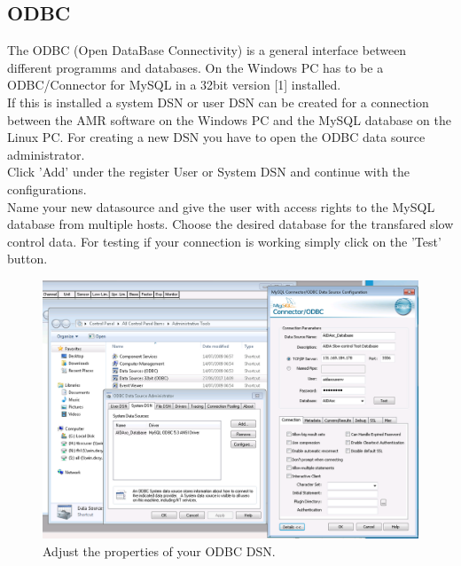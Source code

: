\documentclass[a4paper,12pt]{scrartcl}
\begin{document}
\subsection{ODBC}
The ODBC (Open DataBase Connectivity) is a general interface between different programms and databases. On the Windows PC has to be a ODBC/Connector for MySQL in a 32bit version [1] installed. \\
If this is installed a system DSN or user DSN can be created for a connection between the AMR software on the Windows PC and the MySQL database on the Linux PC. For creating a new DSN you have to open the ODBC data source administrator. \\ Click 'Add' under the register User or System DSN and continue with the configurations. \\
Name your new datasource and give the user with access rights to the MySQL database from multiple hosts. Choose the desired database for the transfared slow control data. For testing if your connection is working simply click on the 'Test' button.

\begin{figure} [H]
\centering
\includegraphics[width=\textwidth]{ODBC.png}
\caption{Adjust the properties of your ODBC DSN.}
\end{figure}
\end{document}
